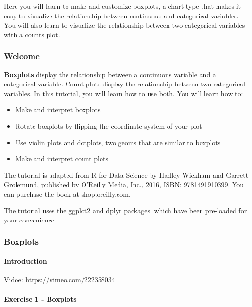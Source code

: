 \documentclass[
]{article}
\providecommand{\tightlist}{%
  \setlength{\itemsep}{0pt}\setlength{\parskip}{0pt}}
\begin{document}
Here you will learn to make and customize boxplots, a chart type that
makes it easy to visualize the relationship between continuous and
categorical variables. You will also learn to visualize the relationship
between two categorical variables with a counts plot.

\hypertarget{welcome-8}{%
\subsubsection{Welcome}\label{welcome-8}}

\textbf{Boxplots} display the relationship between a continuous variable
and a categorical variable. Count plots display the relationship between
two categorical variables. In this tutorial, you will learn how to use
both. You will learn how to:

\begin{itemize}
\tightlist
\item
  Make and interpret boxplots
\item
  Rotate boxplots by flipping the coordinate system of your plot
\item
  Use violin plots and dotplots, two geoms that are similar to boxplots
\item
  Make and interpret count plots
\end{itemize}

The tutorial is adapted from R for Data Science by Hadley Wickham and
Garrett Grolemund, published by O'Reilly Media, Inc., 2016, ISBN:
9781491910399. You can purchase the book at shop.oreilly.com.

The tutorial uses the ggplot2 and dplyr packages, which have been
pre-loaded for your convenience.

\hypertarget{boxplots}{%
\subsubsection{Boxplots}\label{boxplots}}

\hypertarget{introduction-1}{%
\paragraph{Introduction}\label{introduction-1}}

Vidoe: \url{https://vimeo.com/222358034}

\hypertarget{exercise-1---boxplots}{%
\paragraph{Exercise 1 - Boxplots}\label{exercise-1---boxplots}}
\end{document}
